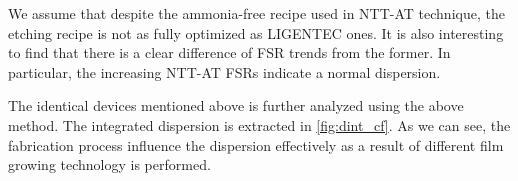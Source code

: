 We assume that despite the ammonia-free recipe used in NTT-AT technique, the etching recipe is not as fully optimized as LIGENTEC ones. It is also interesting to find that there is a clear difference of FSR trends from the former. In particular, the increasing NTT-AT FSRs indicate a normal dispersion.


The identical devices mentioned above is further analyzed using the above method. The integrated dispersion is extracted in \autoref{fig:dint_cf}. As we can see, the fabrication process influence the dispersion effectively as a result of different film growing technology is performed.

\begin{figure}
	\centering
	
	\label{fig:dint_cf}
\end{figure}